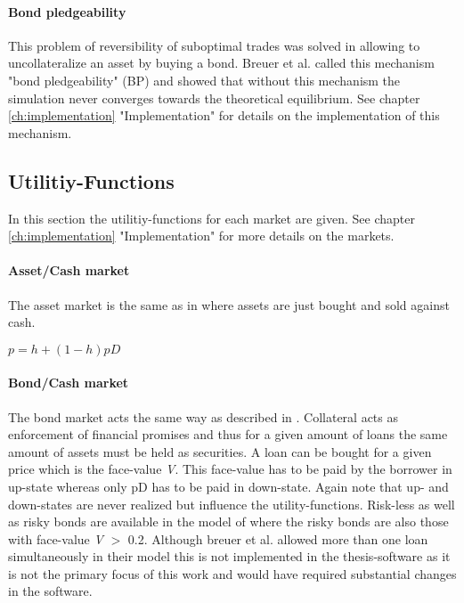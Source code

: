 \documentclass[../Bachelorarbeit.tex]{subfiles}
\begin{document}
\paragraph{Bond pledgeability}
This problem of reversibility of suboptimal trades was solved in allowing to uncollateralize an asset by buying a bond. Breuer et al. called this mechanism "bond pledgeability" (BP) and showed that without this mechanism the simulation never converges towards the theoretical equilibrium. See chapter \ref{ch:implementation} "Implementation" for details on the implementation of this mechanism.

\subsection{Utilitiy-Functions}
In this section the utilitiy-functions for each market are given. See chapter \ref{ch:implementation} "Implementation" for more details on the markets.

\paragraph{Asset/Cash market}
The asset market is the same as in \cite{Geanakoplos2009} where assets are just bought and sold against cash.

\begin{center}
$p = h + ( 1 - h )pD$
\end{center}

\paragraph{Bond/Cash market}
The bond market acts the same way as described in \cite{Geanakoplos2009}. Collateral acts as enforcement of financial promises and thus for a given amount of loans the same amount of assets must be held as securities. A loan can be bought for a given price which is the face-value \textit{V}. This face-value has to be paid by the borrower in up-state whereas only pD has to be paid in down-state. Again note that up- and down-states are never realized but influence the utility-functions.
\medskip
Risk-less as well as risky bonds are available in the model of \cite{Breuer2015} where the risky bonds are also those with face-value \textit{V} $>$ 0.2. Although breuer et al. allowed more than one loan simultaneously in their model this is not implemented in the thesis-software as it is not the primary focus of this work and would have required substantial changes in the software.
\end{document}
